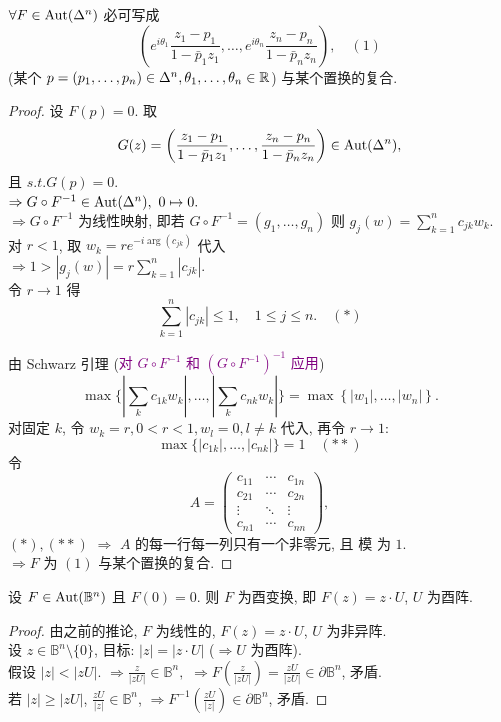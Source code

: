\begin{theorem}
  $\forall F \in \operatorname{Aut}(\Delta ^n)$ 必可写成 \\
   $$ \left( e^{i \theta _1} \frac{z_1-p_1}{1-\bar p_1 z_1},\ldots , e^{i \theta _n} \frac{z_n-p_n}{1-\bar p_n z_n}\right), \quad (1)$$ 
   (某个 $ p=(p_1,\dots, p_n) \in \Delta ^n, \theta _1,\dots,\theta _n \in {\mathbb R}$) 与某个置换的复合.  
\end{theorem}
\begin{proof}
  设 $F(p)=0$. 
  取
  $$ G(z)=\left( \frac{z_1-p_1}{1-\bar p_1 z_1},\ldots ,  \frac{z_n-p_n}{1-\bar p_n z_n}\right) \in \operatorname{Aut} (\Delta ^n), $$
  且 $s.t. G(p)=0$. \\
  $\Rightarrow G \circ F^{-1} \in \operatorname{Aut} (\Delta ^n), ~ 0 \mapsto 0.$\\
  $\Rightarrow G \circ F^{-1}$ 为线性映射, 即若 $G \circ F^{-1}=(g_1,\dots,g_n)$  
  则  $g_j(w)=\sum_{k=1}^{n}c_{jk}w_k$. \\
  对 $r<1$, 
  取 $w_k=r e^{-i \arg (c_{jk})}$ 代入 \\
  $\Rightarrow 1 > |g_j(w)|=r \sum_{k=1}^{n}|c_{jk}|$. \\
  令 $r \to 1$ 
  得 
  $$ \sum_{k=1}^{n}\left| c_{jk} \right| \leq 1, \quad 1 \leq j \leq n.  \quad (*) $$

  由 Schwarz 引理 (\textcolor{purple}{对 $G \circ F^{-1}$  和 $(G \circ F^{-1})^{-1}$ 应用})
  $$ \max \{ |\sum_{k}^{} c_{1k}w_k|,\dots, |\sum_{k}^{} c_{nk}w_k|\} =\max \left\{ |w_1|,\dots,|w_n| \right\}. $$
  对固定 $k$, 
  令 $w_k=r, 0 < r<1, w_l=0, l \neq k$ 
  代入, 
  再令 $r \to 1$: 
  $$  \max \{ | c_{1k}|,\dots, | c_{nk}|\}=1\quad (**) $$ 
  令
  $$ A=\begin{pmatrix}
c_{11} & \cdots  & c_{1n} \\
c_{21} & \cdots  & c_{2n} \\
\vdots  &  \ddots  & \vdots  \\
c_{n1} & \cdots  & c_{nn}
\end{pmatrix} ,$$
$(*),(**)$ $\Rightarrow $ $A$ 的每一行每一列只有一个非零元, 且 模 为 $1$. \\
$\Rightarrow F $ 为 $(1)$ 与某个置换的复合.     
\end{proof}

\begin{lemma}
  设 $F \in \operatorname{Aut}(\mathbb{B}^n)$ 
  且 $F(0)=0$. 
  则 $F$  为酉变换, 即 $F(z)=z \cdot U$, $U$ 为酉阵.  
\end{lemma}
\begin{proof}
  由之前的推论, $F$ 为线性的, $F(z)=z \cdot U$, $U$ 为非异阵. \\
  设 $z \in \mathbb{B}^n \setminus \{0\}$, 
  目标: $|z|=|z \cdot U|$ ($\Rightarrow U$ 为酉阵). \\
  假设 $|z| < |z U|$.
  $\Rightarrow \frac{z}{|zU|} \in \mathbb{B}^n,$ $\Rightarrow F(\frac{z}{|zU|})=\frac{zU}{|zU|} \in \partial \mathbb{B}^n$, 矛盾.\\
  若 $|z| \geq |zU|$, $\frac{zU}{|z|} \in \mathbb{B}^n$, $\Rightarrow F^{-1}\left(\frac{zU}{|z|}\right)\in \partial \mathbb{B}^n$, 矛盾.      
\end{proof}


